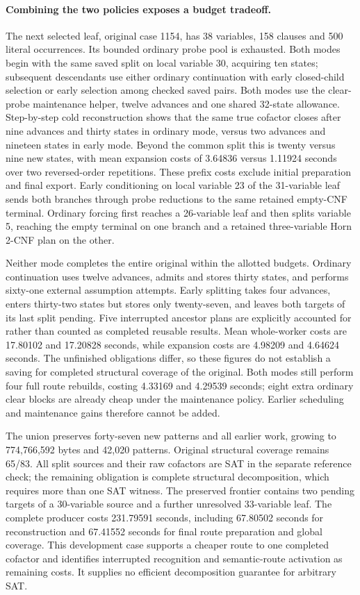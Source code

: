 \documentclass[11pt,a4paper]{article}
\numberwithin{equation}{section}
\theoremstyle{plain}
\theoremstyle{definition}
\theoremstyle{remark}
\begin{document}
\paragraph{Combining the two policies exposes a budget tradeoff.}
The next selected leaf, original case 1154, has 38 variables, 158 clauses and 500 literal occurrences. Its bounded ordinary probe pool is exhausted. Both modes begin with the same saved split on local variable 30, acquiring ten states; subsequent descendants use either ordinary continuation with early closed-child selection or early selection among checked saved pairs. Both modes use the clear-probe maintenance helper, twelve advances and one shared 32-state allowance. Step-by-step cold reconstruction shows that the same true cofactor closes after nine advances and thirty states in ordinary mode, versus two advances and nineteen states in early mode. Beyond the common split this is twenty versus nine new states, with mean expansion costs of 3.64836 versus 1.11924 seconds over two reversed-order repetitions. These prefix costs exclude initial preparation and final export. Early conditioning on local variable 23 of the 31-variable leaf sends both branches through probe reductions to the same retained empty-CNF terminal. Ordinary forcing first reaches a 26-variable leaf and then splits variable 5, reaching the empty terminal on one branch and a retained three-variable Horn 2-CNF plan on the other.

Neither mode completes the entire original within the allotted budgets. Ordinary continuation uses twelve advances, admits and stores thirty states, and performs sixty-one external assumption attempts. Early splitting takes four advances, enters thirty-two states but stores only twenty-seven, and leaves both targets of its last split pending. Five interrupted ancestor plans are explicitly accounted for rather than counted as completed reusable results. Mean whole-worker costs are 17.80102 and 17.20828 seconds, while expansion costs are 4.98209 and 4.64624 seconds. The unfinished obligations differ, so these figures do not establish a saving for completed structural coverage of the original. Both modes still perform four full route rebuilds, costing 4.33169 and 4.29539 seconds; eight extra ordinary clear blocks are already cheap under the maintenance policy. Earlier scheduling and maintenance gains therefore cannot be added.

The union preserves forty-seven new patterns and all earlier work, growing to 774,766,592 bytes and 42,020 patterns. Original structural coverage remains 65/83. All split sources and their raw cofactors are SAT in the separate reference check; the remaining obligation is complete structural decomposition, which requires more than one SAT witness. The preserved frontier contains two pending targets of a 30-variable source and a further unresolved 33-variable leaf. The complete producer costs 231.79591 seconds, including 67.80502 seconds for reconstruction and 67.41552 seconds for final route preparation and global coverage. This development case supports a cheaper route to one completed cofactor and identifies interrupted recognition and semantic-route activation as remaining costs. It supplies no efficient decomposition guarantee for arbitrary SAT.
\end{document}
